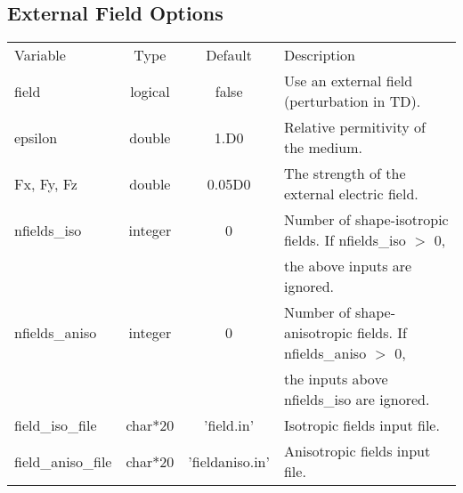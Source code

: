\documentclass[journal=jctcce,manuscript=article]{achemso}
\begin{document}
    \subsection{External Field Options}
    \begin{table}  [H]
      \begin{center}
      \begin{tabular}{ l c c l}
         Variable       & Type    & Default & Description \\
         field          & logical & false   & Use an external field (perturbation in TD). \\
         epsilon        & double  & 1.D0    & Relative permitivity of the medium. \\
         Fx, Fy, Fz     & double  & 0.05D0  & The strength of the external electric field. \\
         nfields\_iso   & integer & 0       & Number of shape-isotropic fields. If nfields\_iso $>$ 0, \\
         &&                                 & the above inputs are ignored.\\
         nfields\_aniso & integer & 0       & Number of shape-anisotropic fields. If nfields\_aniso $>$ 0, \\
         &&                                 & the inputs above nfields\_iso are ignored.\\
         field\_iso\_file   & char*20 & 'field.in'      & Isotropic fields input file. \\
         field\_aniso\_file & char*20 & 'fieldaniso.in' & Anisotropic fields input file. \\
       \end{tabular}
       \end{center}
      \label{lio.tddft.var}
    \end{table}    
\end{document}
